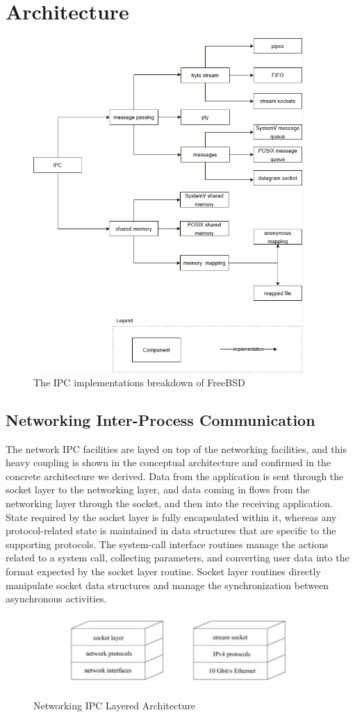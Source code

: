 \documentclass[12pt, dvipsnames, a4paper]{article}
\begin{document}
\section{Architecture}
\begin{figure}[!htb]
	\center
	\includegraphics[width = 290pt]{assets/ipc-implementations.png}
	\caption{The IPC implementations breakdown of FreeBSD}
\end{figure}
\subsection{Networking Inter-Process Communication}
The network IPC facilities are layed on top of the networking facilities, and this heavy coupling is shown in the conceptual architecture and confirmed in the concrete architecture we derived. Data from the application is sent through the socket layer to the networking layer, and data coming in flows from the networking layer through the socket, and then into the receiving application.  State required by the socket layer is fully encapsulated within it, whereas any protocol-related state is maintained in data structures that are specific to the supporting protocols. The system-call interface routines manage the actions related to a system call, collecting parameters, and converting user data into the format expected by the socket layer routine. Socket layer routines directly manipulate socket data structures and manage the synchronization between asynchronous activities.
\begin{figure}[hbt!]
	\centering
	\includegraphics[width=500pt]{assets/IPC_Net_ARCH.png}
	\caption{Networking IPC Layered Architecture}\cite{mckusick}
\end{figure}
\end{document}
